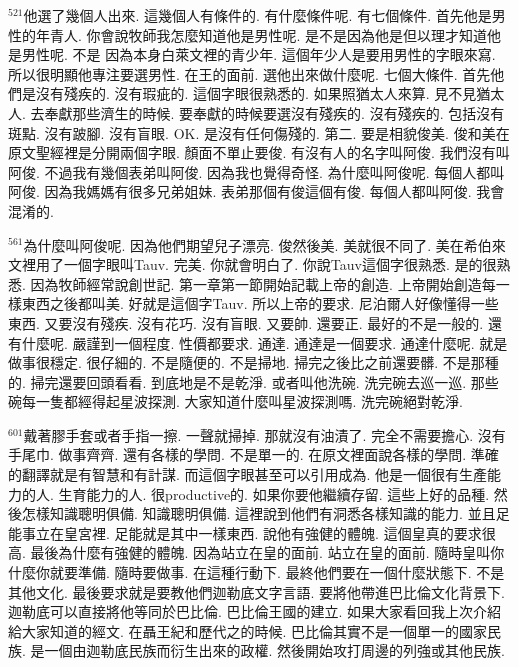 \documentclass{book}
\begin{document}
$^{521}$他選了幾個人出來.
這幾個人有條件的.
有什麼條件呢.
有七個條件.
首先他是男性的年青人.
你會說牧師我怎麼知道他是男性呢.
是不是因為他是但以理才知道他是男性呢.
不是 因為本身白萊文裡的青少年.
這個年少人是要用男性的字眼來寫.
所以很明顯他專注要選男性.
在王的面前.
選他出來做什麼呢.
七個大條件.
首先他們是沒有殘疾的.
沒有瑕疵的.
這個字眼很熟悉的.
如果照猶太人來算.
見不見猶太人.
去奉獻那些濟生的時候.
要奉獻的時候要選沒有殘疾的.
沒有殘疾的.
包括沒有斑點.
沒有跛腳.
沒有盲眼.
OK.
是沒有任何傷殘的.
第二.
要是相貌俊美.
俊和美在原文聖經裡是分開兩個字眼.
顏面不單止要俊.
有沒有人的名字叫阿俊.
我們沒有叫阿俊.
不過我有幾個表弟叫阿俊.
因為我也覺得奇怪.
為什麼叫阿俊呢.
每個人都叫阿俊.
因為我媽媽有很多兄弟姐妹.
表弟那個有俊這個有俊.
每個人都叫阿俊.
我會混淆的.

$^{561}$為什麼叫阿俊呢.
因為他們期望兒子漂亮.
俊然後美.
美就很不同了.
美在希伯來文裡用了一個字眼叫Tauv.
完美.
你就會明白了.
你說Tauv這個字很熟悉.
是的很熟悉.
因為牧師經常說創世記.
第一章第一節開始記載上帝的創造.
上帝開始創造每一樣東西之後都叫美.
好就是這個字Tauv.
所以上帝的要求.
尼泊爾人好像懂得一些東西.
又要沒有殘疾.
沒有花巧.
沒有盲眼.
又要帥.
還要正.
最好的不是一般的.
還有什麼呢.
嚴謹到一個程度.
性價都要求.
通達.
通達是一個要求.
通達什麼呢.
就是做事很穩定.
很仔細的.
不是隨便的.
不是掃地.
掃完之後比之前還要髒.
不是那種的.
掃完還要回頭看看.
到底地是不是乾淨.
或者叫他洗碗.
洗完碗去巡一巡.
那些碗每一隻都經得起星波探測.
大家知道什麼叫星波探測嗎.
洗完碗絕對乾淨.

$^{601}$戴著膠手套或者手指一擦.
一聲就掃掉.
那就沒有油漬了.
完全不需要擔心.
沒有手尾巾.
做事齊齊.
還有各樣的學問.
不是單一的.
在原文裡面說各樣的學問.
準確的翻譯就是有智慧和有計謀.
而這個字眼甚至可以引用成為.
他是一個很有生產能力的人.
生育能力的人.
很productive的.
如果你要他繼續存留.
這些上好的品種.
然後怎樣知識聰明俱備.
知識聰明俱備.
這裡說到他們有洞悉各樣知識的能力.
並且足能事立在皇宮裡.
足能就是其中一樣東西.
說他有強健的體魄.
這個皇真的要求很高.
最後為什麼有強健的體魄.
因為站立在皇的面前.
站立在皇的面前.
隨時皇叫你什麼你就要準備.
隨時要做事.
在這種行動下.
最終他們要在一個什麼狀態下.
不是其他文化.
最後要求就是要教他們迦勒底文字言語.
要將他帶進巴比倫文化背景下.
迦勒底可以直接將他等同於巴比倫.
巴比倫王國的建立.
如果大家看回我上次介紹給大家知道的經文.
在聶王紀和歷代之的時候.
巴比倫其實不是一個單一的國家民族.
是一個由迦勒底民族而衍生出來的政權.
然後開始攻打周邊的列強或其他民族.
\end{document}
